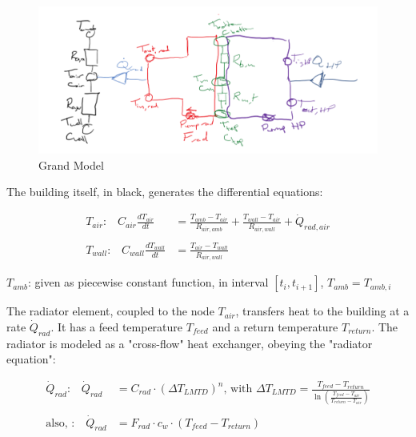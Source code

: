 \begin{figure}[H]
	\centering
	\includegraphics[width=0.9\columnwidth]{Figures/grand_model}
	\caption[Short title]{Grand Model}
	\label{fig:grandmodel}
\end{figure} 

The building itself, in black, generates the differential equations:

\begin{equation}
	\begin{aligned}
		T_{air} \text{:} \quad C_{air}\frac{dT_{air}}{dt} &=\frac{T_{amb}-T_{air}}{R_{air, amb}} + \frac{T_{wall}-T_{air}}{R_{air, wall}} + \dot{Q}_{rad, air} 
		\\ \\
		T_{wall} \text{:} \quad C_{wall}\frac{dT_{wall}}{dt} &=\frac{T_{air}-T_{wall}}{R_{air, wall}}
	\end{aligned}
\end{equation}

$T_{amb}$: given as piecewise constant function, in interval $[t_i, t_{i+1}]$, $T_{amb} = T_{amb, i}$

The radiator element, coupled to the node $T_{air}$, transfers heat to the building at a rate $\dot{Q}_{rad}$. It has a feed temperature $T_{feed}$ and a return temperature $T_{return}$. The radiator is modeled as a "cross-flow" heat exchanger, obeying the "radiator equation":

{\color{blue}
\begin{equation}
	\begin{aligned}
		\dot{Q}_{rad} \text{:} \quad \dot{Q}_{rad} &= C_{rad} \cdot (\Delta T_{LMTD})^n \text{, with } \Delta T_{LMTD} = \frac{T_{feed} - T_{return}}{\ln\left(\frac{T_{feed} -T_{air}}{T_{return} - T_{air}}\right)}
		\\ \\
	    \text{also, :} \quad \dot{Q}_{rad} &= F_{rad} \cdot c_w \cdot (T_{feed} - T_{return})
	\end{aligned}
\end{equation}
}

